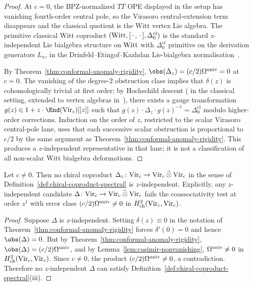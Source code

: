 \begin{proof}
At $c = 0$, the BPZ-normalized $TT$ OPE displayed in the setup has vanishing
fourth-order central pole, so the Virasoro central-extension term
disappears and the classical quotient is the Witt vertex Lie algebra.
The primitive classical Witt coproduct
$(\mathrm{Witt}, [\,\cdot\,,\,\cdot\,], \Delta_{0}^{\mathrm{cl}})$ is the
standard $z$-independent Lie bialgebra structure on $\mathrm{Witt}$ with
$\Delta_{0}^{\mathrm{cl}}$ primitive on the derivation generators
$L_{n}$, in the Drinfeld--Etingof--Kazhdan Lie-bialgebra
normalisation~\cite{Dri87,EK96}.

By Theorem~\ref{thm:conformal-anomaly-rigidity},
$\obs(\Delta_{z}) = (c/2) \Cas = 0$ at $c = 0$. The vanishing of the
degree-$2$ obstruction class implies that $\delta(z)$ is
cohomologically trivial at first order; by Hochschild descent
(\cite{HKR62} in the classical setting, extended to vertex algebras
in~\cite{FBZ04}), there exists a gauge transformation
$g(z) \in 1 + z \cdot \End(\Virc)[[z]]$ such that
$g(z) \cdot \Delta_{z} \cdot g(z)^{-1} = \Delta_{0}^{\mathrm{cl}}$
modulo higher-order corrections. Induction on the order of $z$,
restricted to the scalar Virasoro central-pole lane, uses that each
successive scalar obstruction is proportional to $c/2$ by the same
argument as Theorem~\ref{thm:conformal-anomaly-rigidity}. This
produces a $z$-independent representative in that lane; it is not a
classification of all non-scalar Witt bialgebra deformations.
\end{proof}

\begin{proposition}
\label{prop:spectral-parameter-forced-at-nonzero-c}
\ClaimStatusProvedHere
Let $c \neq 0$. Then no chiral coproduct
$\Delta_{z}\colon \mathrm{Vir}_{c} \to \mathrm{Vir}_{c} \mathbin{\widehat{\otimes}} \mathrm{Vir}_{c}$ in
the sense of Definition~\ref{def:chiral-coproduct-spectral} is
$z$-independent. Explicitly, any $z$-independent candidate
$\Delta\colon \mathrm{Vir}_{c} \to \mathrm{Vir}_{c} \mathbin{\widehat{\otimes}} \mathrm{Vir}_{c}$ fails
the coassociativity test at order $z^{1}$ with error class
$(c/2) \Omega^{\mathrm{univ}} \neq 0$ in $H^{2}_{\mathrm{ch}}(\mathrm{Vir}_{c}, \mathrm{Vir}_{c})$.
\end{proposition}

\begin{proof}
Suppose $\Delta$ is $z$-independent. Setting $\delta(z) \equiv 0$ in
the notation of Theorem~\ref{thm:conformal-anomaly-rigidity} forces
$\delta'(0) = 0$ and hence $\obs(\Delta) = 0$. But by
Theorem~\ref{thm:conformal-anomaly-rigidity},
$\obs(\Delta) = (c/2) \Cas$, and by
Lemma~\ref{lem:casimir-nonvanishing}, $\Omega^{\mathrm{univ}} \neq 0$ in
$H^{2}_{\mathrm{ch}}(\mathrm{Vir}_{c}, \mathrm{Vir}_{c})$. Since $c \neq 0$, the product
$(c/2) \Omega^{\mathrm{univ}} \neq 0$, a contradiction. Therefore no $z$-independent
$\Delta$ can satisfy Definition~\ref{def:chiral-coproduct-spectral}(iii).
\end{proof}


